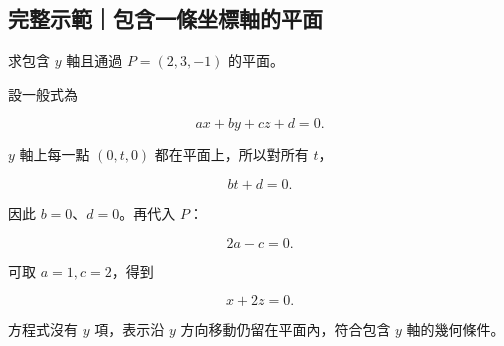 \documentclass[11pt,a4paper]{article}
\begin{document}
\begin{HandoutWorkedExample}

\subsection{完整示範｜包含一條坐標軸的平面}\label{ux5b8cux6574ux793aux7bc4ux5305ux542bux4e00ux689dux5750ux6a19ux8ef8ux7684ux5e73ux9762}

求包含 \(y\) 軸且通過 \(P=(2,3,-1)\) 的平面。

設一般式為

\[
ax+by+cz+d=0.
\]

\(y\) 軸上每一點 \((0,t,0)\) 都在平面上，所以對所有 \(t\)，

\[
bt+d=0.
\]

因此 \(b=0\)、\(d=0\)。再代入 \(P\)：

\[
2a-c=0.
\]

可取 \(a=1,c=2\)，得到

\[
\boxed{x+2z=0}.
\]

方程式沒有 \(y\) 項，表示沿 \(y\) 方向移動仍留在平面內，符合包含 \(y\) 軸的幾何條件。

\end{HandoutWorkedExample}
\end{document}
